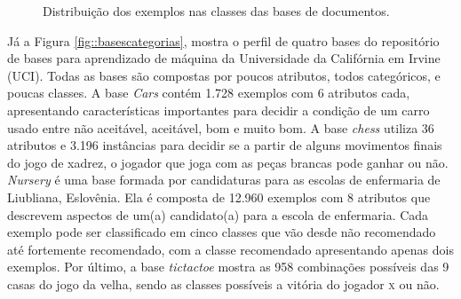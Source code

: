 \begin{figure}[!h]

\caption{Distribuição dos exemplos nas classes das bases de documentos.}
\label{fig::basesdoc}
\end{figure}

Já a Figura \ref{fig::basescategorias}, mostra o perfil de quatro bases do repositório de bases para aprendizado de máquina da Universidade da Califórnia em Irvine (\textsc{UCI}). Todas as bases são compostas por poucos atributos, todos categóricos, e poucas classes. 
A base \textit{Cars} contém 1.728 exemplos com 6 atributos cada, apresentando características importantes para decidir a condição de um carro usado entre não aceitável, aceitável, bom e muito bom. A base \textit{chess} utiliza 36 atributos e 3.196 instâncias para decidir se a partir de alguns movimentos finais do jogo de xadrez, o jogador que joga com as peças brancas pode ganhar ou não. \textit{Nursery} é uma base formada por candidaturas para as escolas de enfermaria de Liubliana, Eslovênia. Ela é composta de 12.960 exemplos com 8 atributos que descrevem aspectos de um(a) candidato(a) para a escola de enfermaria. Cada exemplo pode ser classificado em cinco classes que vão desde não recomendado até fortemente recomendado, com a classe recomendado apresentando apenas dois exemplos. 
Por último, a base \textit{tictactoe} mostra as 958 combinações possíveis das 9 casas do jogo da velha, sendo as classes possíveis a vitória do jogador \textsc{x} ou não.

